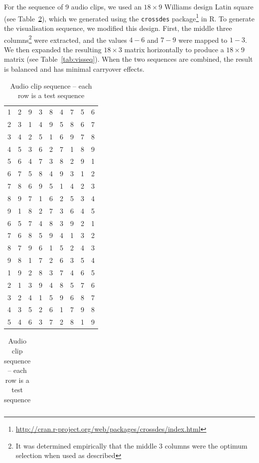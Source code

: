 For the sequence of 9 audio clips, we used an $18\times9$ Williams design Latin square (see Table~\ref{tab:clipseq}),
which we generated using the \texttt{crossdes}
package\footnote{\url{http://cran.r-project.org/web/packages/crossdes/index.html}} in R. To generate the visualisation
sequence, we modified this design. First, the middle three columns\footnote{It was determined empirically that the
  middle 3 columns were the optimum selection when used as described} were extracted, and the values $4-6$ and $7-9$
were mapped to $1-3$. We then expanded the resulting $18\times3$ matrix horizontally to produce a $18\times9$ matrix
(see Table~\ref{tab:visseq}). When the two sequences are combined, the result is balanced and has minimal carryover
effects.

\begin{table}
  \parbox{.45\linewidth}{
    \centering
    \begin{tabular}{rrrrrrrrr}

      1 & 2 & 9 & 3 & 8 & 4 & 7 & 5 & 6 \\ 
      2 & 3 & 1 & 4 & 9 & 5 & 8 & 6 & 7 \\ 
      3 & 4 & 2 & 5 & 1 & 6 & 9 & 7 & 8 \\ 
      4 & 5 & 3 & 6 & 2 & 7 & 1 & 8 & 9 \\ 
      5 & 6 & 4 & 7 & 3 & 8 & 2 & 9 & 1 \\ 
      6 & 7 & 5 & 8 & 4 & 9 & 3 & 1 & 2 \\ 
      7 & 8 & 6 & 9 & 5 & 1 & 4 & 2 & 3 \\ 
      8 & 9 & 7 & 1 & 6 & 2 & 5 & 3 & 4 \\ 
      9 & 1 & 8 & 2 & 7 & 3 & 6 & 4 & 5 \\ 
      6 & 5 & 7 & 4 & 8 & 3 & 9 & 2 & 1 \\ 
      7 & 6 & 8 & 5 & 9 & 4 & 1 & 3 & 2 \\ 
      8 & 7 & 9 & 6 & 1 & 5 & 2 & 4 & 3 \\ 
      9 & 8 & 1 & 7 & 2 & 6 & 3 & 5 & 4 \\ 
      1 & 9 & 2 & 8 & 3 & 7 & 4 & 6 & 5 \\ 
      2 & 1 & 3 & 9 & 4 & 8 & 5 & 7 & 6 \\ 
      3 & 2 & 4 & 1 & 5 & 9 & 6 & 8 & 7 \\ 
      4 & 3 & 5 & 2 & 6 & 1 & 7 & 9 & 8 \\ 
      5 & 4 & 6 & 3 & 7 & 2 & 8 & 1 & 9 \\ 
    \end{tabular}
    \caption{Audio clip sequence -- each row is a test sequence}
    \label{tab:clipseq}
  }
  \hfill
  \parbox{.45\linewidth}{
    \centering
    \begin{tabular}{rrrrrrrrr}


\end{tabular}}
\end{table}
